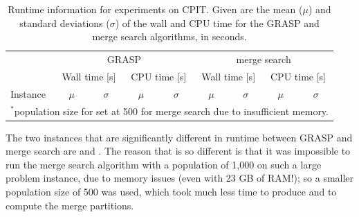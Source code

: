 \documentclass[journal]{IEEEtran}
\begin{document}
\begin{table}[h!]
\centering
\caption[Runtime information for experiments on CPIT]{Runtime information for experiments on CPIT. Given are the mean (\(\mu\)) and standard deviations (\(\sigma\)) of the wall and CPU time for the GRASP and merge search algorithms, in seconds.}\label{tab:mine:runtime}
\begin{adjustbox}{width=0.45\textwidth}
\begin{tabular}{lrrrrrrrr} \toprule
 & \multicolumn{4}{c}{GRASP} & \multicolumn{4}{c}{merge search}\\
\cmidrule(lr){2-5} \cmidrule(lr){6-9}
 & \multicolumn{2}{c}{Wall time [s]} & \multicolumn{2}{c}{CPU time [s]} & \multicolumn{2}{c}{Wall time [s]} & \multicolumn{2}{c}{CPU time [s]}\\
\cmidrule(lr){2-3}\cmidrule(lr){4-5} \cmidrule(lr){6-7}\cmidrule(lr){8-9}
Instance & \multicolumn{1}{c}{\(\mu\)}&\multicolumn{1}{c}{\(\sigma\)} & \multicolumn{1}{c}{\(\mu\)}& \multicolumn{1}{c}{\(\sigma\)}& \multicolumn{1}{c}{\(\mu\)}&\multicolumn{1}{c}{\(\sigma\)} & \multicolumn{1}{c}{\(\mu\)}& \multicolumn{1}{c}{\(\sigma\)}\\ \midrule



\bottomrule
\multicolumn{9}{l}{\(^*\)population size for \zucklarge{} set at 500 for merge search due to insufficient memory.}
\end{tabular}
\end{adjustbox}
\end{table}

The two instances that are significantly different in runtime between GRASP and merge search are \dmine{} and \zucklarge{}. The reason that \zucklarge{} is so different is that it was impossible to run the merge search algorithm with a population of 1,000 on such a large problem instance, due to memory issues (even with 23 GB of RAM!); so a smaller population size of 500 was used, which took much less time to produce and to compute the merge partitions.
\end{document}
